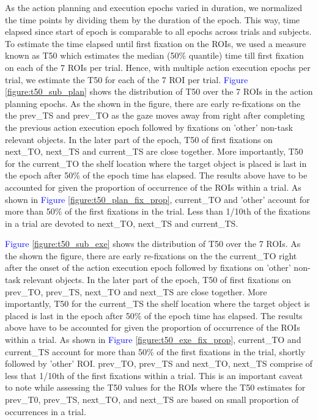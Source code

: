 As the action planning and execution epochs varied in duration, we normalized the time points by dividing them by the duration of the epoch. This way, time elapsed since start of epoch is comparable to all epochs across trials and subjects. To estimate the time elapsed until first fixation on the ROIs, we used a measure known as T50 which estimates the median (50\% quantile) time till first fixation on each of the 7 ROIs per trial. Hence, with multiple action execution epochs per trial, we estimate the T50 for each of the 7 ROI per trial. \textcolor{Blue}{Figure \ref{figure:t50_sub_plan}} shows the distribution of T50 over the 7 ROIs in the action planning epochs. As the shown in the figure, there are early re-fixations on the the prev\_TS and prev\_TO as the gaze moves away from right after completing the previous action execution epoch followed by fixations on 'other' non-task relevant objects. In the later part of the epoch, T50 of first fixations on next\_TO, next\_TS and current\_TS are close together. More importantly, T50 for the current\_TO the shelf location where the target object is placed is last in the epoch after 50\% of the epoch time has elapsed. The results above have to be accounted for given the proportion of occurrence of the ROIs within a trial. As shown in \textcolor{Blue}{Figure \ref{figure:t50_plan_fix_prop}}, current\_TO and 'other' account for more than 50\% of the first fixations in the trial. Less than 1/10th of the fixations in a trial  are devoted to next\_TO, next\_TS and current\_TS.

\textcolor{Blue}{Figure \ref{figure:t50_sub_exe}} shows the distribution of T50 over the 7 ROIs. As the shown the figure, there are early re-fixations on the the current\_TO right after the onset of the action execution epoch followed by fixations on 'other' non-task relevant objects. In the later part of the epoch, T50 of first fixations on prev\_TO, prev\_TS, next\_TO and next\_TS are close together. More importantly, T50 for the current\_TS the shelf location where the target object is placed is last in the epoch after 50\% of the epoch time has elapsed. The results above have to be accounted for given the proportion of occurrence of the ROIs within a trial. As shown in \textcolor{Blue}{Figure \ref{figure:t50_exe_fix_prop}}, current\_TO and current\_TS account for more than 50\% of the first fixations in the trial, shortly followed by 'other' ROI. prev\_TO, prev\_TS and next\_TO, next\_TS comprise of less that 1/10th of the first fixations within a trial. This is an important caveat to note while assessing the T50 values for the ROIs where the T50 estimates for prev\_T0, prev\_TS, next\_TO, and next\_TS are based on small proportion of occurrences in a trial.

